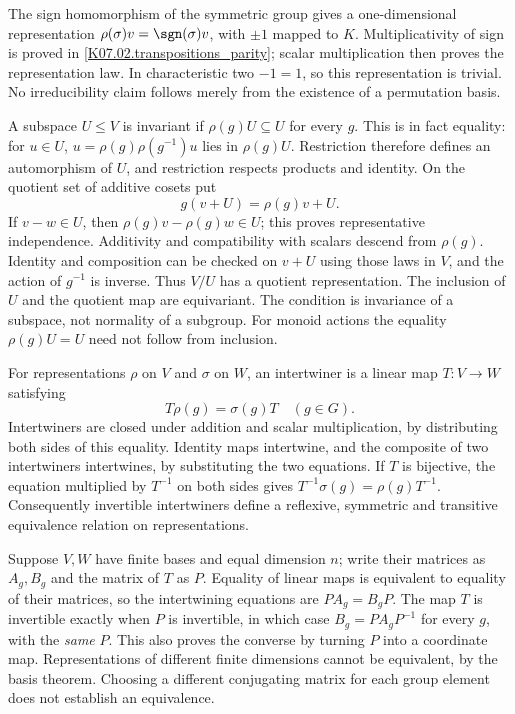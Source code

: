 The sign homomorphism of the symmetric group gives a one-dimensional
representation $\rho(\sigma)v=\sgn(\sigma)v$, with $\pm1$ mapped
to $K$. Multiplicativity of sign is proved in
\ref{K07.02.transpositions_parity}; scalar multiplication then proves
the representation law. In characteristic two $-1=1$, so this
representation is trivial. No irreducibility claim follows merely
from the existence of a permutation basis.

A subspace $U\le V$ is invariant if $\rho(g)U\subseteq U$ for
every $g$. This is in fact equality: for $u\in U$,
$u=\rho(g)\rho(g^{-1})u$ lies in $\rho(g)U$. Restriction therefore
defines an automorphism of $U$, and restriction respects products and
identity. On the quotient set of additive cosets put
\[
 g(v+U)=\rho(g)v+U.
\]
If $v-w\in U$, then $\rho(g)v-\rho(g)w\in U$; this proves
representative independence. Additivity and compatibility with scalars
descend from $\rho(g)$. Identity and composition can be checked on
$v+U$ using those laws in $V$, and the action of $g^{-1}$ is inverse.
Thus $V/U$ has a quotient representation. The inclusion of $U$ and
the quotient map are equivariant. The condition is invariance of a
subspace, not normality of a subgroup. For monoid actions the equality
$\rho(g)U=U$ need not follow from inclusion.

For representations $\rho$ on $V$ and $\sigma$ on $W$, an
intertwiner is a linear map $T:V\to W$ satisfying
\[
 T\rho(g)=\sigma(g)T\quad(g\in G).
\]
Intertwiners are closed under addition and scalar multiplication, by
distributing both sides of this equality. Identity maps intertwine,
and the composite of two intertwiners intertwines, by substituting
the two equations. If $T$ is bijective, the equation multiplied by
$T^{-1}$ on both sides gives
$T^{-1}\sigma(g)=\rho(g)T^{-1}$. Consequently invertible
intertwiners define a reflexive, symmetric and transitive equivalence
relation on representations.

Suppose $V,W$ have finite bases and equal dimension $n$; write their
matrices as $A_g,B_g$ and the matrix of $T$ as $P$. Equality of linear
maps is equivalent to equality of their matrices, so the intertwining
equations are $PA_g=B_gP$. The map $T$ is invertible exactly when
$P$ is invertible, in which case
$B_g=PA_gP^{-1}$ for every $g$, with the \emph{same} $P$.
This also proves the converse by turning $P$ into a coordinate map.
Representations of different finite dimensions cannot be equivalent,
by the basis theorem. Choosing a different conjugating matrix for
each group element does not establish an equivalence.

